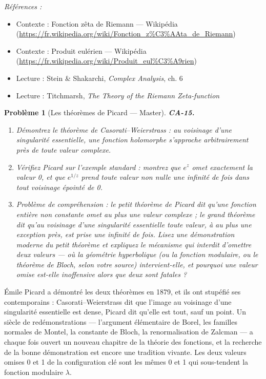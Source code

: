\documentclass[11pt]{article}
\newtheorem{problem}{Problème}
\newenvironment{refs}{\par\small\noindent\emph{Références :}\begin{itemize}\setlength\itemsep{0pt}}{\end{itemize}\normalsize}
\begin{document}
\begin{refs}
\item Contexte : Fonction zêta de Riemann --- Wikipédia (\url{https://fr.wikipedia.org/wiki/Fonction_z%C3%AAta_de_Riemann})
\item Contexte : Produit eulérien --- Wikipédia (\url{https://fr.wikipedia.org/wiki/Produit_eul%C3%A9rien})
\item Lecture : Stein \& Shakarchi, \textit{Complex Analysis}, ch. 6
\item Lecture : Titchmarsh, \textit{The Theory of the Riemann Zeta-function}
\end{refs}

\bigskip

\begin{problem}[{Les théorèmes de Picard --- Master}]
\textbf{CA-15.} \begin{enumerate}
\item[(a)] Démontrez le théorème de Casorati--Weierstrass : au voisinage
d'une singularité essentielle, une fonction holomorphe s'approche arbitrairement près de toute
valeur complexe.
\item[(b)] Vérifiez Picard sur l'exemple standard : montrez que $ e^z $ omet exactement la valeur 0, et
que $ e^{1/z} $ prend toute valeur non nulle une infinité de fois dans tout voisinage épointé de
0.
\item[(c)] Problème de compréhension : le petit théorème de Picard dit qu'une fonction entière non
constante omet au plus une valeur complexe ; le grand théorème dit qu'au voisinage d'une singularité
essentielle toute valeur, à au plus une exception près, est prise une infinité de fois. Lisez une
démonstration moderne du petit théorème et expliquez le mécanisme qui interdit d'omettre deux
valeurs --- où la géométrie hyperbolique (ou la fonction modulaire, ou le théorème de Bloch, selon
votre source) intervient-elle, et pourquoi une valeur omise est-elle inoffensive alors que deux sont
fatales ?
\end{enumerate}

\end{problem}

\noindent Émile Picard a démontré les deux théorèmes en 1879, et ils ont stupéfié ses
contemporains : Casorati--Weierstrass dit que l'image au voisinage d'une singularité essentielle est
dense, Picard dit qu'elle est tout, sauf un point. Un siècle de redémonstrations --- l'argument
élémentaire de Borel, les familles normales de Montel, la constante de Bloch, la renormalisation de
Zalcman --- a chaque fois ouvert un nouveau chapitre de la théorie des fonctions, et la recherche de
la \og{} bonne \fg{} démonstration est encore une tradition vivante. Les deux valeurs omises 0 et 1 de la
configuration clé sont les mêmes 0 et 1 qui sous-tendent la fonction modulaire $\lambda$.
\end{document}
